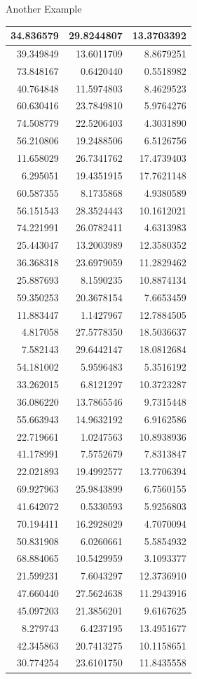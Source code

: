 \documentclass[
  ignorenonframetext,
]{beamer}
\begin{document}
\begin{frame}{Another Example}
\begin{table}
\begin{tabular}[t]{r|r|r}
\hline
34.836579 & 29.8244807 & 13.3703392\\
\hline
39.349849 & 13.6011709 & 8.8679251\\
\hline
73.848167 & 0.6420440 & 0.5518982\\
\hline
40.764848 & 11.5974803 & 8.4629523\\
\hline
60.630416 & 23.7849810 & 5.9764276\\
\hline
74.508779 & 22.5206403 & 4.3031890\\
\hline
56.210806 & 19.2488506 & 6.5126756\\
\hline
11.658029 & 26.7341762 & 17.4739403\\
\hline
6.295051 & 19.4351915 & 17.7621148\\
\hline
60.587355 & 8.1735868 & 4.9380589\\
\hline
56.151543 & 28.3524443 & 10.1612021\\
\hline
74.221991 & 26.0782411 & 4.6313983\\
\hline
25.443047 & 13.2003989 & 12.3580352\\
\hline
36.368318 & 23.6979059 & 11.2829462\\
\hline
25.887693 & 8.1590235 & 10.8874134\\
\hline
59.350253 & 20.3678154 & 7.6653459\\
\hline
11.883447 & 1.1427967 & 12.7884505\\
\hline
4.817058 & 27.5778350 & 18.5036637\\
\hline
7.582143 & 29.6442147 & 18.0812684\\
\hline
54.181002 & 5.9596483 & 5.3516192\\
\hline
33.262015 & 6.8121297 & 10.3723287\\
\hline
36.086220 & 13.7865546 & 9.7315448\\
\hline
55.663943 & 14.9632192 & 6.9162586\\
\hline
22.719661 & 1.0247563 & 10.8938936\\
\hline
41.178991 & 7.5752679 & 7.8313847\\
\hline
22.021893 & 19.4992577 & 13.7706394\\
\hline
69.927963 & 25.9843899 & 6.7560155\\
\hline
41.642072 & 0.5330593 & 5.9256803\\
\hline
70.194411 & 16.2928029 & 4.7070094\\
\hline
50.831908 & 6.0260661 & 5.5854932\\
\hline
68.884065 & 10.5429959 & 3.1093377\\
\hline
21.599231 & 7.6043297 & 12.3736910\\
\hline
47.660440 & 27.5624638 & 11.2943916\\
\hline
45.097203 & 21.3856201 & 9.6167625\\
\hline
8.279743 & 6.4237195 & 13.4951677\\
\hline
42.345863 & 20.7413275 & 10.1158651\\
\hline
30.774254 & 23.6101750 & 11.8435558\\
\hline
\end{tabular}
\end{table}
\end{frame}
\end{document}
